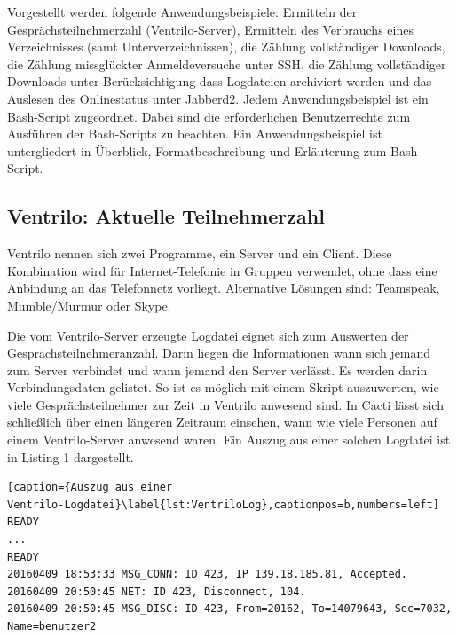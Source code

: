 \documentclass[12pt,ngerman,toc=listofnumbered,toc=bibliographynumbered,toc=index,headsepline=true]{scrbook}
\begin{document}
Vorgestellt werden folgende
 Anwendungsbeispiele: Ermitteln der
Ge\-sprächs\-teil\-neh\-mer\-zahl (Ventrilo-Server), Ermitteln des Verbrauchs
eines Verzeichnisses (samt Unterverzeichnissen), die Zählung vollständiger Downloads,
die Zählung missglückter Anmeldeversuche unter SSH, die Zählung vollständiger
Downloads unter Berücksichtigung dass Logdateien archiviert werden und das
Auslesen des Onlinestatus unter Jabberd2. Jedem Anwendungsbeispiel ist ein
Bash-Script zugeordnet. Dabei sind die erforderlichen Benutzerrechte zum
Ausführen der Bash-Scripts zu beachten. Ein Anwendungsbeispiel ist untergliedert
in Überblick, Formatbeschreibung und Erläuterung zum Bash-Script.

\subsection{Ventrilo: Aktuelle Teilnehmerzahl}
Ventrilo nennen sich zwei Programme, ein Server und ein Client. Diese
Kombination wird für Internet-Telefonie in Gruppen verwendet, ohne dass
eine Anbindung an das Telefonnetz vorliegt. Alternative  Lösungen sind:
Teamspeak, Mumble/Murmur oder Skype.

Die vom Ventrilo-Server erzeugte Logdatei eignet sich zum Auswerten der
Gesprächsteilnehmeranzahl. Darin liegen die Informationen wann sich jemand zum
Server verbindet und wann jemand den Server verlässt. Es werden darin
Verbindungsdaten gelistet. So ist es möglich mit einem Skript auszuwerten, wie
viele Gesprächsteilnehmer zur Zeit in Ventrilo anwesend sind. In Cacti lässt
sich schließlich über einen längeren Zeitraum einsehen, wann wie viele Personen
auf einem Ventrilo-Server anwesend waren. Ein Auszug aus einer solchen Logdatei
ist in Listing 1 dargestellt.

\begin{lstlisting}[caption={Auszug aus einer
Ventrilo-Logdatei}\label{lst:VentriloLog},captionpos=b,numbers=left]
READY
...
READY
20160409 18:53:33 MSG_CONN: ID 423, IP 139.18.185.81, Accepted. 
20160409 20:50:45 NET: ID 423, Disconnect, 104. 
20160409 20:50:45 MSG_DISC: ID 423, From=20162, To=14079643, Sec=7032, Name=benutzer2
\end{lstlisting}
\end{document}
